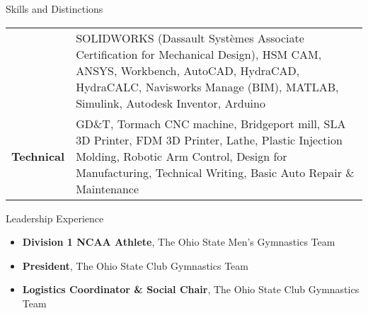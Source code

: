 \documentclass[10pt]{article}
\newcommand{\hskills}[1]{\bfseries #1}
\begin{document}
\begin{resume_sec}
    {Skills and Distinctions}
    \vspace{4pt}
    \begin{addmargin}{2pt}
    \begin{tabular}{p{5.5em} p{48em}}
        \raisebox{0cm}{\hskills{\hspace{.03cm}Software}}
        & {\fontsize{9.25pt}{11pt}\selectfont SOLIDWORKS (Dassault Systèmes Associate Certification for Mechanical Design), HSM CAM, ANSYS, Workbench, \newline
        AutoCAD, HydraCAD, HydraCALC, Navisworks Manage (BIM), MATLAB, Simulink, Autodesk Inventor, Arduino} \\[0.55cm]
        \hskills{Technical} & {\fontsize{9.25pt}{11pt}\selectfont GD\&T, Tormach CNC machine, Bridgeport mill, SLA 3D Printer, FDM 3D Printer, Lathe, Plastic Injection Molding, \newline
        Robotic Arm Control, Design for Manufacturing, Technical Writing, Basic Auto Repair \& Maintenance} \\
    \end{tabular}
    \end{addmargin}
\end{resume_sec}

\begin{resume_sec}
    {Leadership Experience}
    \begin{itemize}
        \item 
            \textbf{Division 1 NCAA Athlete},
            The Ohio State Men’s Gymnastics Team
        
        \item
            \textbf{President},
            The Ohio State Club Gymnastics Team
        \item
            \textbf{Logistics Coordinator \& Social Chair},
            The Ohio State Club Gymnastics Team
    \end{itemize}
\end{resume_sec}
\unskip
\end{document}
